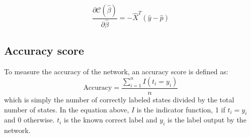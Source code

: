 \begin{equation}\label{eq:delta-c}
	\frac{\partial \mathcal{C}(\hat{\beta})}{\partial \hat{\beta}} = -\hat{X}^T\left(\hat{y}-\hat{p}\right)
\end{equation}

\subsection{Accuracy score}\label{seq:accuracy} 
To measure the accuracy of the network, an accuracy score is defined as:
\begin{equation*}
	\text{Accuracy} = \frac{\sum_{i=1}^{n} I(t_i = y_i)}{n}
\end{equation*}
which is simply the number of correctly labeled states divided by the
total number of states. In the equation above, $I$ is the indicator function,
1 if $t_i = y_i$ and 0 otherwise. $t_i$ is the known correct label and $y_i$ is the
label output by the network.





